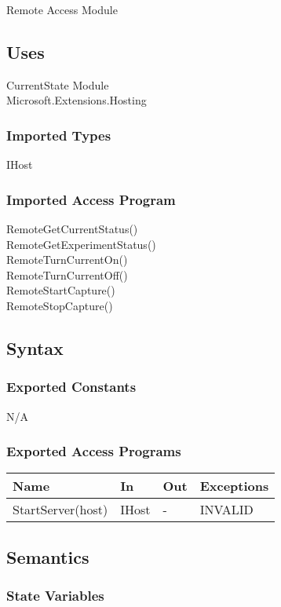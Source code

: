 \documentclass[12pt, titlepage]{article}
\begin{document}
Remote Access Module

\subsection{Uses}
CurrentState Module \\
Microsoft.Extensions.Hosting
\subsubsection{Imported Types}
IHost

\subsubsection{Imported Access Program}
RemoteGetCurrentStatus() \\
RemoteGetExperimentStatus() \\
RemoteTurnCurrentOn() \\
RemoteTurnCurrentOff() \\
RemoteStartCapture() \\
RemoteStopCapture() \\

\subsection{Syntax}

\subsubsection{Exported Constants}
N/A
\subsubsection{Exported Access Programs}

\begin{center}
\begin{tabular}{p{7cm} p{3cm} p{1cm} p{3cm}}
\hline
\textbf{Name} & \textbf{In} & \textbf{Out} & \textbf{Exceptions} \\
\hline
StartServer(host) & IHost & - & INVALID \\
\hline
\end{tabular}
\end{center}

\subsection{Semantics}

\subsubsection{State Variables}
\end{document}
